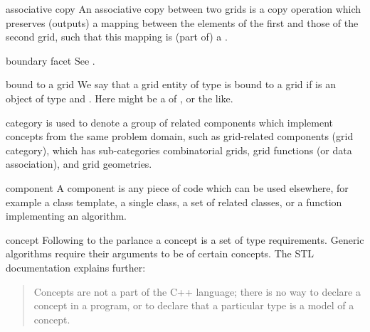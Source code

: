 
\begin{Glossar}
\item[associative copy]
  An associative copy between two grids is a copy operation
  which preserves (outputs) a mapping between the elements of the first and
  those of the second grid, such that this mapping is (part of) a 
  .

\item[boundary facet] See .

\item[bound to a grid] 
  We say that a grid entity  of type 
  is bound to a grid 
  if  is an object of type  
  and .
  Here  might be a  of 
  ,
   or the like.

\item[category]
  is used to denote a group of related components
  which implement concepts from the same problem domain, such
  as grid-related components (grid category), which has 
  sub-categories combinatorial grids, grid functions (or data association),
  and grid geometries.

\item[component]
  A component is any piece of code which can be used elsewhere,
  for example a class template, a single class, a set of related classes,
  or a function implementing an algorithm.

\item[concept]
  Following to the 
   parlance
  a concept is a set of type requirements.
  Generic algorithms require their arguments to be 
  of certain concepts.
  The STL documentation explains further:
  \begin{quote}
    Concepts are not a part of the C++ language; there is no way to declare a concept in a
    program, or to declare that a particular type is a model of a concept.
  \end{quote}


\end{Glossar}
